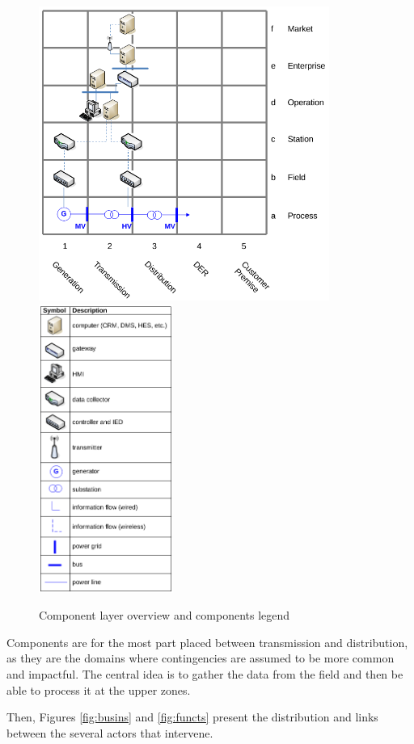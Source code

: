 \begin{figure}[!htb]\centering
  \includegraphics[width=9.5cm]{Data/components.png}
  \hspace{0.3cm}
  \includegraphics[width=4.4cm]{Data/legends.png}
\caption{Component layer overview and components legend}
\label{fig:comps}
\end{figure}
Components are for the most part placed between transmission and distribution, as they are the domains where contingencies are assumed to be more common and impactful. The central idea is to gather the data from the field and then be able to process it at the upper zones.

Then, Figures \ref{fig:busins} and \ref{fig:functs} present the distribution and links between the several actors that intervene.

